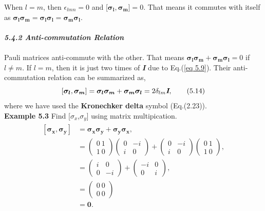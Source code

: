 \documentclass{article}
\newcommand{\bfit}[1]{\textit{\textbf{#1}}}
\begin{document}
When $l=m$, then $\epsilon_{lmn}=0$ and [$\boldsymbol{\sigma_l},\boldsymbol{\sigma_m}]=0$. That means it commutes with itself as 
$\boldsymbol{\sigma_l}\boldsymbol{\sigma_m}=\boldsymbol{\sigma_l}\boldsymbol{\sigma_l}=\boldsymbol{\sigma_m}\boldsymbol{\sigma_l}$.
\\\\
\bfit{\large 5.4.2 Anti-commutation Relation}\\\\
Pauli matrices anti-commute with the other. That means $\boldsymbol{\sigma_l}\boldsymbol{\sigma_m}+\boldsymbol{\sigma_m}\boldsymbol{\sigma_l}=0$ if
$l\neq m$. If $l=m$, then it is just two times of \bfit{I} due to Eq.(\ref{eq 5.9}). Their
anti-commutation relation can be summarized as,
\begin{equation} \label{eq 5.14}
    [\boldsymbol{\sigma_l},\boldsymbol{\sigma_m}]=\boldsymbol{\sigma_l\sigma_m}+\boldsymbol{\sigma_m\sigma_l}=2\delta_{lm}\bfit{I},\tag{5.14}
\end{equation}
where we have used the \textbf{Kronechker delta} symbol (Eq.(2.23)).
\\
\textbf{Example 5.3} Find [\textbf{$\sigma_x$},\textbf{$\sigma_y$}] using matrix multipication.
\begin{align} \label{eq 5.15}
    \begin{split}
        [\boldsymbol{\sigma_x}, \boldsymbol{\sigma_y}]&=\boldsymbol{\sigma_x\sigma_y}+\boldsymbol{\sigma_y\sigma_x},\\
        &=\begin{pmatrix}
            0\ 1\\1\ 0
        \end{pmatrix}
        \begin{pmatrix}
            0 &-i\\ i& 0
        \end{pmatrix}+
        \begin{pmatrix}
            0& -i\\ i& 0
        \end{pmatrix}
        \begin{pmatrix}
            0\ 1 \\ 1\ 0
        \end{pmatrix},\\
        &=\begin{pmatrix}
            i & 0\\ 0& -i
        \end{pmatrix}+
        \begin{pmatrix}
            -i & 0\\ 0& i
        \end{pmatrix},\\
        &=\begin{pmatrix}
            0\ 0\\ 0\ 0
        \end{pmatrix}\\
        &= \textbf{0}.
    \end{split} \tag{5.15}
\end{align}
\end{document}
